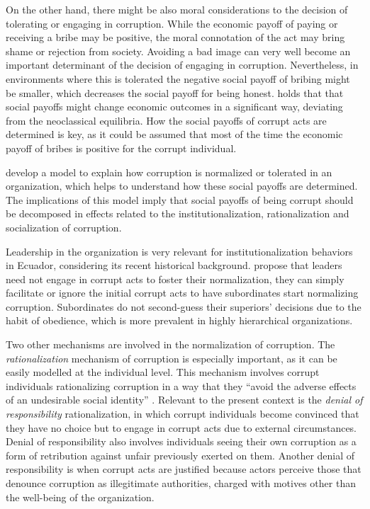 \documentclass[12pt,a4]{article}\usepackage[]{graphicx}\usepackage[]{xcolor}
\begin{document}
On the other hand, there might be also moral considerations to the decision of tolerating or engaging in corruption. While the economic payoff of paying or receiving a bribe may be positive, the moral connotation of the act may bring shame or rejection from society. Avoiding a bad image can very well become an important determinant of the decision of engaging in corruption. Nevertheless, in environments where this is tolerated the negative social payoff of bribing might be smaller, which decreases the social payoff for being honest. \textcite{Akerlof.1980} holds that that social payoffs might change economic outcomes in a significant way, deviating from the neoclassical equilibria. How the social payoffs of corrupt acts are determined is key, as it could be assumed that most of the time the economic payoff of bribes is positive for the corrupt individual. 

\textcite{Ashforth.2003} develop a model to explain how corruption is normalized or tolerated in an organization, which helps to understand how these social payoffs are determined. The implications of this model imply that social payoffs of being corrupt should be decomposed in effects related to the institutionalization, rationalization and socialization of corruption.

Leadership in the organization is very relevant for institutionalization behaviors in Ecuador, considering its recent historical background. \textcite{Ashforth.2003} propose that leaders need not engage in corrupt acts to foster their normalization, they can simply facilitate or ignore the initial corrupt acts to have subordinates start normalizing corruption. Subordinates do not second-guess their superiors' decisions due to the habit of obedience, which is more prevalent in highly hierarchical organizations.

Two other mechanisms are involved in the normalization of corruption. The \textit{rationalization} mechanism of corruption is especially important, as it can be easily modelled at the individual level. This mechanism involves corrupt individuals rationalizing corruption in a way that they \enquote{avoid the adverse effects of an undesirable social identity} \parencite[p.13]{Ashforth.2003}. Relevant to the present context is the \textit{denial of responsibility} rationalization, in which corrupt individuals become convinced that they have no choice but to engage in corrupt acts due to external circumstances.  Denial of responsibility also involves individuals seeing their own corruption as a form of retribution against unfair previously exerted on them. Another denial of responsibility is when corrupt acts are justified because actors perceive those that denounce corruption as illegitimate authorities, charged with motives other than the well-being of the organization.
\end{document}
